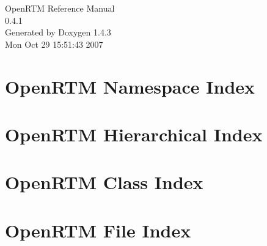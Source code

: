 \documentclass[a4paper]{book}
\begin{document}
\begin{titlepage}
\vspace*{7cm}
\begin{center}
{\Large Open\-RTM Reference Manual\\[1ex]\large 0.4.1 }\\
\vspace*{1cm}
{\large Generated by Doxygen 1.4.3}\\
\vspace*{0.5cm}
{\small Mon Oct 29 15:51:43 2007}\\
\end{center}
\end{titlepage}
\clearemptydoublepage
{}
\tableofcontents
\clearemptydoublepage
{}
\chapter{Open\-RTM Namespace Index}

\chapter{Open\-RTM Hierarchical Index}

\chapter{Open\-RTM Class Index}

\chapter{Open\-RTM File Index}

\end{document}
